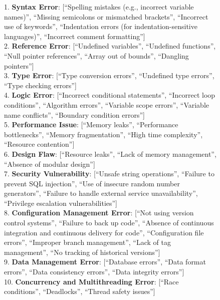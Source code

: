\documentclass[11pt, a4paper, logo, copyright, nonumbering, amsart]{map}
\begin{document}
\begin{CJK*}{UTF8}{gbsn}
\begin{figure*}[h!]
\begin{center}
\begin{tcolorbox}[width=1\textwidth, colback=lightblue, title={\textbf{Full Error Typelists}}]
    1. \textbf{Syntax Error}: [``Spelling mistakes (e.g., incorrect variable names)'', ``Missing semicolons or mismatched brackets'', ``Incorrect use of keywords'', ``Indentation errors (for indentation-sensitive languages)'', ``Incorrect comment formatting''] \\
    
    2. \textbf{Reference Error}: [``Undefined variables'', ``Undefined functions'', ``Null pointer references'', ``Array out of bounds'', ``Dangling pointers''] \\
    
    3. \textbf{Type Error}: [``Type conversion errors'', ``Undefined type errors'', ``Type checking errors''] \\
    
    4. \textbf{Logic Error}: [``Incorrect conditional statements'', ``Incorrect loop conditions'', ``Algorithm errors'', ``Variable scope errors'', ``Variable name conflicts'', ``Boundary condition errors''] \\
    
    5. \textbf{Performance Issue}: [``Memory leaks'', ``Performance bottlenecks'', ``Memory fragmentation'', ``High time complexity'', ``Resource contention''] \\
    
    6. \textbf{Design Flaw}: [``Resource leaks'', ``Lack of memory management'', ``Absence of modular design''] \\
    
    7. \textbf{Security Vulnerability}: [``Unsafe string operations'', ``Failure to prevent SQL injection'', ``Use of insecure random number generators'', ``Failure to handle external service unavailability'', ``Privilege escalation vulnerabilities''] \\
    
    8. \textbf{Configuration Management Error}: [``Not using version control systems'', ``Failure to back up code'', ``Absence of continuous integration and continuous delivery for code'', ``Configuration file errors'', ``Improper branch management'', ``Lack of tag management'', ``No tracking of historical versions''] \\
    
    9. \textbf{Data Management Error}: [``Database errors'', ``Data format errors'', ``Data consistency errors'', ``Data integrity errors''] \\
    
    10. \textbf{Concurrency and Multithreading Error}: [``Race conditions'', ``Deadlocks'', ``Thread safety issues''] \\
    

\end{tcolorbox}
\end{center}
\end{figure*}
\end{CJK*}
\end{document}
